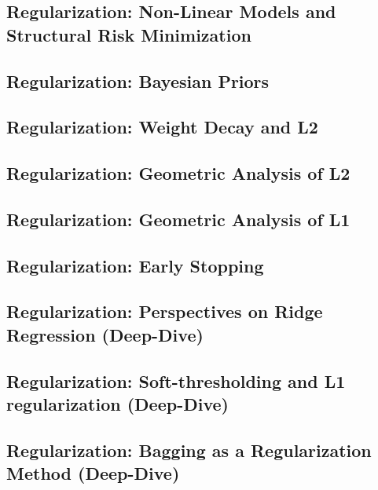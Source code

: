 \subsection{Regularization: Non-Linear Models and Structural Risk Minimization}


\subsection{Regularization: Bayesian Priors}


\subsection{Regularization: Weight Decay and L2}


\subsection{Regularization: Geometric Analysis of L2}


\subsection{Regularization: Geometric Analysis of L1}


\subsection{Regularization: Early Stopping}


\subsection{Regularization: Perspectives on Ridge Regression (Deep-Dive)}


\subsection{Regularization: Soft-thresholding and L1 regularization (Deep-Dive)}


\subsection{Regularization: Bagging as a Regularization Method (Deep-Dive)}







